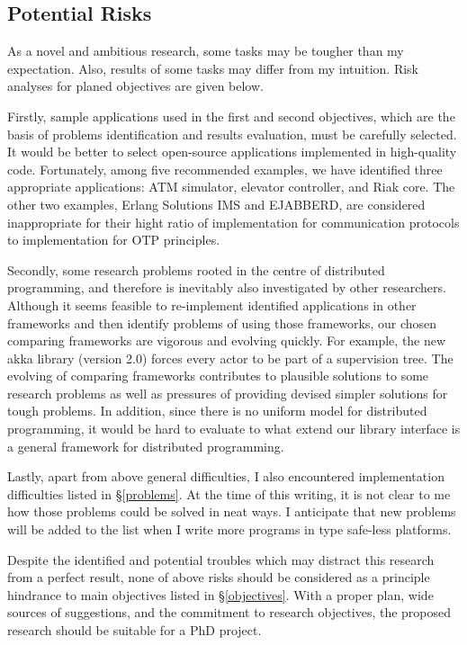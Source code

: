 \subsection{Potential Risks}
As a novel and ambitious research, some tasks may be tougher than my expectation.  Also, results of some tasks may differ from my intuition.  Risk analyses for planed objectives are given below.

Firstly, sample applications used in the first and second objectives, which are the basis of problems identification and results evaluation, must be carefully selected.  It would be better to select open-source applications implemented in high-quality code.  Fortunately, among five recommended examples, we have identified three appropriate applications: ATM simulator, elevator controller, and Riak core.  The other two examples, Erlang Solutions IMS and EJABBERD, are considered inappropriate for their hight ratio of implementation for communication protocols to implementation for OTP principles.

Secondly, some research problems rooted in the centre of distributed programming, and therefore is inevitably also investigated by other researchers.  Although it seems feasible to re-implement identified applications in other frameworks and then identify problems of using those frameworks, our chosen comparing frameworks are vigorous and evolving quickly.  For example, the new akka library (version 2.0) forces every actor to be part of a supervision tree.  The evolving of comparing frameworks contributes to plausible solutions to some research problems as well as pressures of providing devised simpler solutions for tough problems.  In addition, since there is no uniform model for distributed programming, it would be hard to evaluate to what extend our library interface is a general framework for distributed programming.

Lastly, apart from above general difficulties, I also encountered implementation difficulties listed in \S\ref{problems}.  At the time of this writing, it is not clear to me how those problems could be solved in neat ways.  I anticipate that new problems will be added to the list when I write more programs in type safe-less platforms.

Despite the identified and potential troubles which may distract this research from a perfect result, none of above risks should be considered as a principle hindrance to main objectives listed in \S\ref{objectives}.  With a proper plan, wide sources of suggestions, and the commitment to research objectives, the proposed research should be suitable for a PhD project.